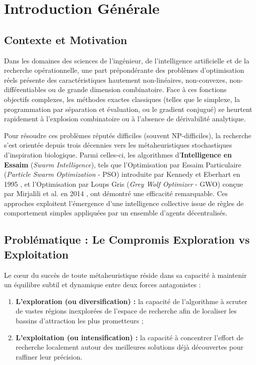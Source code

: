 \chapter{Introduction Générale}
\label{chap:intro}

\section{Contexte et Motivation}
Dans les domaines des sciences de l'ingénieur, de l'intelligence artificielle et de la recherche opérationnelle, une part prépondérante des problèmes d'optimisation réels présente des caractéristiques hautement non-linéaires, non-convexes, non-différentiables ou de grande dimension combinatoire. Face à ces fonctions objectifs complexes, les méthodes exactes classiques (telles que le simplexe, la programmation par séparation et évaluation, ou le gradient conjugué) se heurtent rapidement à l'explosion combinatoire ou à l'absence de dérivabilité analytique.

Pour résoudre ces problèmes réputés difficiles (souvent NP-difficiles), la recherche s'est orientée depuis trois décennies vers les métaheuristiques stochastiques d'inspiration biologique. Parmi celles-ci, les algorithmes d'\textbf{Intelligence en Essaim} (\textit{Swarm Intelligence}), tels que l'Optimisation par Essaim Particulaire (\textit{Particle Swarm Optimization} - PSO) introduite par Kennedy et Eberhart en 1995 \cite{kennedy1995particle}, et l'Optimisation par Loups Gris (\textit{Grey Wolf Optimizer} - GWO) conçue par Mirjalili et al. en 2014 \cite{mirjalili2014grey}, ont démontré une efficacité remarquable. Ces approches exploitent l'émergence d'une intelligence collective issue de règles de comportement simples appliquées par un ensemble d'agents décentralisés.

\section{Problématique : Le Compromis Exploration vs Exploitation}
Le cœur du succès de toute métaheuristique réside dans sa capacité à maintenir un équilibre subtil et dynamique entre deux forces antagonistes :
\begin{enumerate}[label=\textbf{\arabic*.}]
    \item \textbf{L'exploration (ou diversification) :} la capacité de l'algorithme à scruter de vastes régions inexplorées de l'espace de recherche afin de localiser les bassins d'attraction les plus prometteurs ;
    \item \textbf{L'exploitation (ou intensification) :} la capacité à concentrer l'effort de recherche localement autour des meilleures solutions déjà découvertes pour raffiner leur précision.
\end{enumerate}

